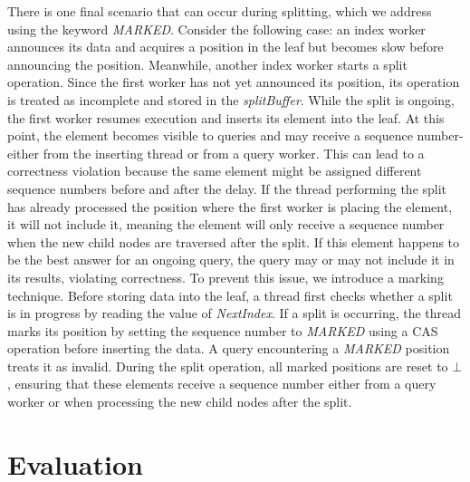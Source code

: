 \documentclass[a4paper,11pt,twoside,openany]{book}
\begin{document}
There is one final scenario that can occur during splitting, which we address
using the keyword \textit{MARKED}. Consider the following case: an index worker
announces its data and acquires a position in the leaf but becomes slow before
announcing the position. Meanwhile, another index worker starts a split operation.
Since the first worker has not yet announced its position, its operation is treated
as incomplete and stored in the \textit{splitBuffer}.  
%
While the split is ongoing, the first worker resumes execution and inserts its element
into the leaf. At this point, the element becomes visible to queries and may receive
a sequence number-either from the inserting thread or from a query worker. This can
lead to a correctness violation because the same element might be assigned different
sequence numbers before and after the delay. If the thread performing the split has
already processed the position where the first worker is placing the element,
it will not include it, meaning the element will only receive a sequence number
when the new child nodes are traversed after the split. If this element happens
to be the best answer for an ongoing query, the query may or may not include it in
its results, violating correctness.  
%
To prevent this issue, we introduce a marking technique. Before storing data into 
the leaf, a thread first checks whether a split is in progress by reading the value
of \textit{NextIndex}. If a split is occurring, the thread marks its position
by setting the sequence number to \textit{MARKED} using a CAS operation before
inserting the data. A query encountering a \textit{MARKED} position treats it as 
invalid. During the split operation, all marked positions are reset to \( \bot \), 
ensuring that these elements receive a sequence number either from a query worker
or when processing the new child nodes after the split.



\chapter{Evaluation}
\label{chapter:Evaluation}






\cleardoublepage
{}

\end{document}
